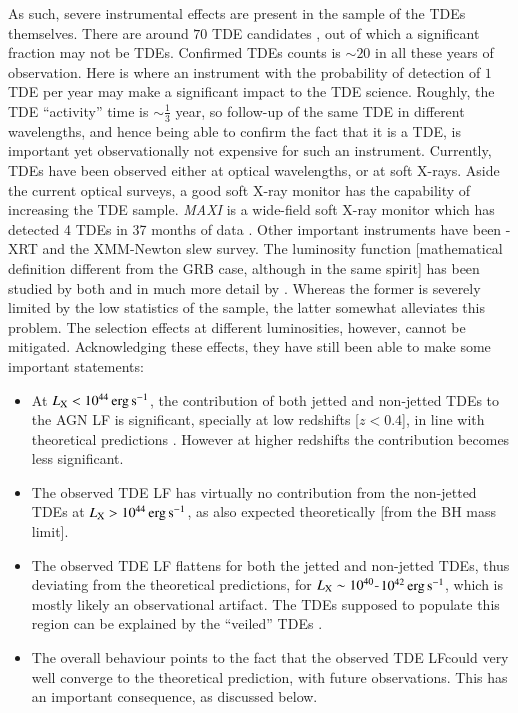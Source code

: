 As such, severe instrumental effects are present in the sample of the TDEs themselves. There are around $70$ TDE candidates \citep{Auchettl_et_al.-2017-ApJ}, out of which a significant fraction may not be TDEs. Confirmed TDEs counts is $\sim 20$ in all these years of observation. Here is where an instrument with the probability of detection of $1$ TDE per year may make a significant impact to the TDE science. Roughly, the TDE ``activity'' time is $\sim \frac{1}{3}$ year, so follow-up of the same TDE in different wavelengths, and hence being able to confirm the fact that it is a TDE, is important yet observationally not expensive for such an instrument. Currently, TDEs have been observed either at optical wavelengths, or at soft X-rays. Aside the current optical surveys, a good soft X-ray monitor has the capability of increasing the TDE sample. \emph{MAXI} is a wide-field soft X-ray monitor which has detected 4 TDEs in 37 months of data \citep{Kawamuro_et_al.-2016-PASJ}. Other important instruments have been \s -XRT and the XMM-Newton slew survey. The luminosity function [mathematical definition different from the GRB case, although in the same spirit] has been studied by both \cite{Kawamuro_et_al.-2016-PASJ} and in much more detail by \cite{Auchettl_et_al.-2018-ApJ}. Whereas the former is severely limited by the low statistics of the sample, the latter somewhat alleviates this problem. The selection effects at different luminosities, however, cannot be mitigated. Acknowledging these effects, they have still been able to make some important statements:

\begin{itemize}
\item At $L_{\rm X} < 10^{44} \, \rm erg \, s^{-1}$, the contribution of both jetted and non-jetted TDEs to the AGN LF is significant, specially at low redshifts [$z < 0.4$], in line with theoretical predictions \citep{Milosavljevic_et_al.-2006-ApJ}. However at higher redshifts the contribution becomes less significant.

\item The observed TDE LF has virtually no contribution from the non-jetted TDEs at $L_{\rm X} > 10^{44} \, \rm erg \, s^{-1}$, as also expected theoretically [from the BH mass limit].

\item The observed TDE LF flattens for both the jetted and non-jetted TDEs, thus deviating from the theoretical predictions, for $L_{\rm X} \sim 10^{40}$-$10^{42} \, \rm erg \, s^{-1}$, which is mostly likely an observational artifact. The TDEs supposed to populate this region can be explained by the ``veiled'' TDEs \citep{Auchettl_et_al.-2017-ApJ}.

\item The overall behaviour points to the fact that the observed TDE LFcould very well converge to the theoretical prediction, with future observations. This has an important consequence, as discussed below.
\end{itemize}

